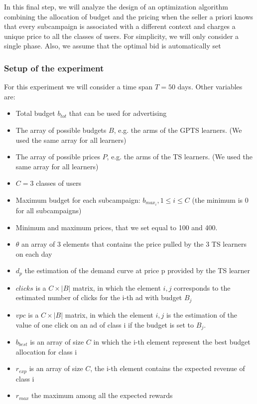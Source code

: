 In this final step, we will analyze the design of an optimization algorithm combining the allocation of budget and the pricing when the seller a priori knows that every subcampaign is associated with a different context and charges a unique price to all the classes of users.
For simplicity, we will only consider a single phase. Also, we assume that the optimal bid is automatically set

\subsubsection{Setup of the experiment}
For this experiment we will consider a time span $T=50$ days. Other variables are:
\begin{itemize}
    \item Total budget $b_{tot}$ that can be used for advertising
    \item The array of possible budgets $B$, e.g. the arms of the GPTS learners. (We used the same array for all learners)
    \item The array of possible prices $P$, e.g. the arms of the TS learners. (We used the same array for all learners)
    \item $C=3$ classes of users
    \item Maximum budget for each subcampaign: $b_{max_i}, 1 \leq i \leq C$ (the minimum is 0 for all subcampaigns)
    \item Minimum and maximum prices, that we set equal to 100 and 400.
    \item $\theta$ an array of 3 elements that contains the price pulled by the 3 TS learners on each day
    \item $d_p$ the estimation of the demand curve at price p provided by the TS learner
    \item $clicks$ is a $C \times |B|$ matrix, in which the element $i,j$ corresponds to the estimated number of clicks for the i-th ad with budget $B_j$
    \item $vpc$ is a $C \times |B|$ matrix, in which the element $i,j$ is the estimation of the value of one click on an ad of class i if the budget is set to $B_j$.
    \item $b_{best}$ is an array of size $C$ in which the i-th element represent the best budget allocation for class i
    \item $r_{exp}$ is an array of size $C$, the i-th element contains the expected revenue of class i
    \item $r_{max}$ the maximum among all the expected rewards
\end{itemize}

